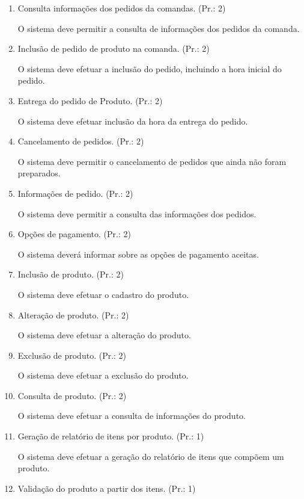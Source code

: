 \begin{enumerate}[
	label=RF\arabic{*}, 
	ref=(RF\arabic{*}),
	leftmargin=1.5em,
	itemindent=4.5em]
\item Consulta informações dos pedidos da comandas. (Pr.: 2)\par
O sistema deve permitir a consulta de informações dos pedidos da comanda.\par
\item Inclusão de pedido de produto na comanda. (Pr.: 2)\par
O sistema deve efetuar a inclusão do pedido, incluindo a hora inicial do pedido.\par
\item Entrega do pedido de Produto. (Pr.: 2)\par
O sistema deve efetuar inclusão da hora da entrega do pedido.\par
\item Cancelamento de pedidos. (Pr.: 2)\par
O sistema deve permitir o cancelamento de pedidos que ainda não foram preparados.\par
\item Informações de pedido. (Pr.: 2)\par
O sistema deve permitir a consulta das informações dos pedidos.\par
\item Opções de pagamento. (Pr.: 2)\par
O sistema deverá informar sobre as opções de pagamento aceitas.\par
\item Inclusão de produto. (Pr.: 2)\par
O sistema deve efetuar o cadastro do produto.\par
\item Alteração de produto. (Pr.: 2)\par
O sistema deve efetuar a alteração do produto.\par
\item Exclusão de produto. (Pr.: 2)\par
O sistema deve efetuar a exclusão do produto.\par
\item Consulta de produto. (Pr.: 2)\par
O sistema deve efetuar a consulta de informações do produto.\par
\item Geração de relatório de itens por produto. (Pr.: 1)\par
O sistema deve efetuar a geração do relatório de itens que compõem um produto.\par
\item Validação do produto a partir dos itens. (Pr.: 1)\par

\end{enumerate}
